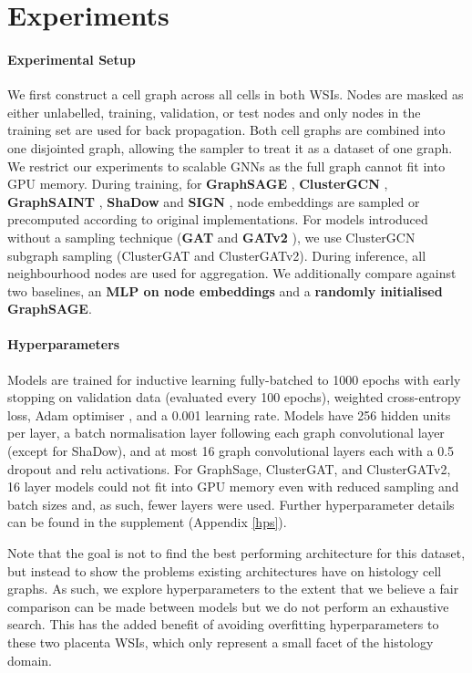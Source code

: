 \documentclass{article}
\begin{document}
\section{Experiments}
\label{experiments}

\paragraph{Experimental Setup} We first construct a cell graph across all cells in both WSIs. Nodes are masked as either unlabelled, training, validation, or test nodes and only nodes in the training set are used for back propagation. Both cell graphs are combined into one disjointed graph, allowing the sampler to treat it as a dataset of one graph. We restrict our experiments to scalable GNNs as the full graph cannot fit into GPU memory. During training, for \textbf{GraphSAGE} \cite{hamilton_inductive_2017}, \textbf{ClusterGCN} \cite{chiang_cluster-gcn_2019}, \textbf{GraphSAINT} \cite{zeng_graphsaint_2020}, \textbf{ShaDow} \cite{zeng_decoupling_2022} and \textbf{SIGN} \cite{frasca_sign_2020}, node embeddings are sampled or precomputed according to original implementations. For models introduced without a sampling technique (\textbf{GAT} \cite{velickovic_graph_2018} and \textbf{GATv2} \cite{brody_how_2022}), we use ClusterGCN subgraph sampling (ClusterGAT and ClusterGATv2). During inference, all neighbourhood nodes are used for aggregation. We additionally compare against two baselines, an \textbf{MLP on node embeddings} and a \textbf{randomly initialised GraphSAGE}.

\paragraph{Hyperparameters} Models are trained for inductive learning fully-batched to 1000 epochs with early stopping on validation data (evaluated every 100 epochs), weighted cross-entropy loss, Adam optimiser \cite{kingma_adam_2014}, and a 0.001 learning rate. Models have 256 hidden units per layer, a batch normalisation layer following each graph convolutional layer (except for ShaDow), and at most 16 graph convolutional layers each with a 0.5 dropout and relu activations. For GraphSage, ClusterGAT, and ClusterGATv2, 16 layer models could not fit into GPU memory even with reduced sampling and batch sizes and, as such, fewer layers were used. Further hyperparameter details can be found in the supplement (Appendix \ref{hps}).

Note that the goal is not to find the best performing architecture for this dataset, but instead to show the problems existing architectures have on histology cell graphs. As such, we explore hyperparameters to the extent that we believe a fair comparison can be made between models but we do not perform an exhaustive search. This has the added benefit of avoiding overfitting hyperparameters to these two placenta WSIs, which only represent a small facet of the histology domain.
\end{document}
